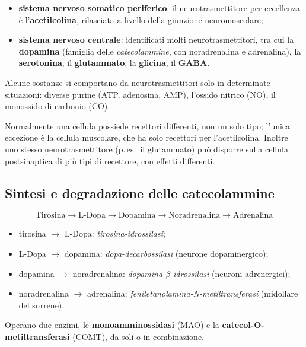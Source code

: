 \begin{itemize}
  \item \textbf{sistema nervoso somatico periferico}: il neurotrasmettitore per eccellenza è
    l'\textbf{acetilcolina}, rilasciata a livello della giunzione neuromuscolare;
  \item \textbf{sistema nervoso centrale}: identificati molti neurotrasmettitori, tra cui la
    \textbf{dopamina} (famiglia delle \textit{catecolammine}, con noradrenalina e adrenalina), la
    \textbf{serotonina}, il \textbf{glutammato}, la \textbf{glicina}, il \textbf{GABA}.
\end{itemize}

Alcune sostanze si comportano da neurotrasmettitori solo in determinate situazioni: diverse purine
(ATP, adenosina, AMP), l'ossido nitrico (NO), il monossido di carbonio (CO).

Normalmente una cellula possiede recettori differenti, non un solo tipo; l'unica eccezione è la
cellula muscolare, che ha solo recettori per l'acetilcolina. Inoltre uno stesso neurotrasmettitore
(p.\,es.\ il glutammato) può disporre sulla cellula postsinaptica di più tipi di recettore, con
effetti differenti.

\subsection{Sintesi e degradazione delle catecolammine}

$$\text{Tirosina} \rightarrow \text{L-Dopa} \rightarrow \text{Dopamina} \rightarrow
\text{Noradrenalina} \rightarrow \text{Adrenalina}$$
\begin{itemize}
  \item tirosina $\rightarrow$ L-Dopa: \textit{tirosina-idrossilasi};
  \item L-Dopa $\rightarrow$ dopamina: \textit{dopa-decarbossilasi} (neurone dopaminergico);
  \item dopamina $\rightarrow$ noradrenalina: \textit{dopamina-$\beta$-idrossilasi} (neuroni
    adrenergici);
  \item noradrenalina $\rightarrow$ adrenalina:
    \textit{feniletanolamina-N-metiltransferasi} (midollare del surrene).
\end{itemize}

Operano due enzimi, le \textbf{monoamminossidasi} (MAO) e la \textbf{catecol-O-metiltransferasi}
(COMT), da soli o in combinazione.

